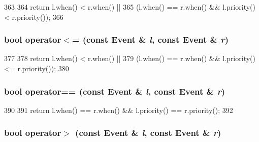 \begin{DoxyCode}
363 {
364     return l.when() < r.when() ||
365         (l.when() == r.when() && l.priority() < r.priority());
366 }
\end{DoxyCode}
\hypertarget{eventq_8hh_a321ab1717492451522fed22375ae8363}{
\subsubsection[{operator$<$=}]{\setlength{\rightskip}{0pt plus 5cm}bool operator$<$= (const {\bf Event} \& {\em l}, \/  const {\bf Event} \& {\em r})}}
\label{eventq_8hh_a321ab1717492451522fed22375ae8363}



\begin{DoxyCode}
377 {
378     return l.when() < r.when() ||
379         (l.when() == r.when() && l.priority() <= r.priority());
380 }
\end{DoxyCode}
\hypertarget{eventq_8hh_aa242d3b194771eaf0fd66a3c7b646816}{
\subsubsection[{operator==}]{\setlength{\rightskip}{0pt plus 5cm}bool operator== (const {\bf Event} \& {\em l}, \/  const {\bf Event} \& {\em r})}}
\label{eventq_8hh_aa242d3b194771eaf0fd66a3c7b646816}



\begin{DoxyCode}
390 {
391     return l.when() == r.when() && l.priority() == r.priority();
392 }
\end{DoxyCode}
\hypertarget{eventq_8hh_a4bec4ae1c2599b058e50d02e0bb08962}{
\subsubsection[{operator$>$}]{\setlength{\rightskip}{0pt plus 5cm}bool operator$>$ (const {\bf Event} \& {\em l}, \/  const {\bf Event} \& {\em r})}}
\label{eventq_8hh_a4bec4ae1c2599b058e50d02e0bb08962}



